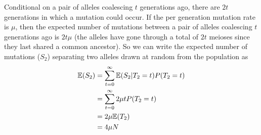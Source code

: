 Conditional on a pair of alleles coalescing $t$ generations ago,
there are $2t$ generations in which a mutation could occur. If the per
generation mutation rate is $\mu$, then the expected number of
mutations between a pair of alleles coalescing $t$ generations ago is
$2 t\mu$ (the alleles have gone through a total of $2t$ meioses since they last shared a common ancestor). So we can write the expected
number of mutations ($S_2$) separating two alleles drawn at random from the
population as %
\begin{align}
\mathbb{E}(S_2) &= \sum_{t=0}^{\infty} \mathbb{E}(S_2 | T_2=t) P(T_2=t) \nonumber\\
& =\sum_{t=0}^{\infty} 2 \mu t P(T_2=t) \nonumber\\
& =2\mu \mathbb{E}(T_2)  \nonumber\\
& = 4 \mu N 
\end{align}
 
